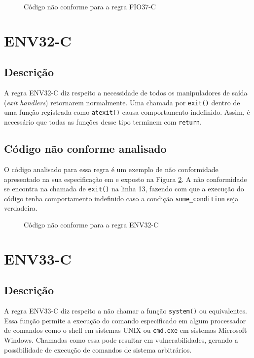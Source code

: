 \begin{figure}[h!]
  \centering
  
  \caption{Código não conforme para a regra FIO37-C}
\label{fig:FIO37-C}
\end{figure}

\section{ENV32-C}
\subsection{Descrição}

A regra ENV32-C diz respeito a necessidade de todos os manipuladores de saída (\textit{exit handlers}) retornarem normalmente. Uma chamada por \texttt{exit()} dentro de uma função registrada como \texttt{atexit()} causa comportamento indefinido. Assim, é necessário que todas as funções desse tipo terminem com \texttt{return}.

\subsection{Código não conforme analisado}

O código analisado para essa regra é um exemplo de não conformidade apresentado na sua especificação em \cite{ccert} e exposto na Figura \ref{fig:ENV32-C}. A não conformidade se encontra na chamada de \texttt{exit()} na linha 13, fazendo com que a execução do código tenha comportamento indefinido caso a condição \texttt{some\_condition} seja verdadeira.

\begin{figure}[h!]
  \centering
  
  \caption{Código não conforme para a regra ENV32-C}
\label{fig:ENV32-C}
\end{figure}

\section{ENV33-C}
\subsection{Descrição}

A regra ENV33-C diz respeito a não chamar a função \texttt{system()} ou equivalentes. Essa função permite a execução do comando especificado em algum processador de comandos como o shell em sistemas UNIX ou \texttt{cmd.exe} em sistemas Microsoft Windows. Chamadas como essa pode resultar em vulnerabilidades, gerando a possibilidade de execução de comandos de sistema arbitrários.

